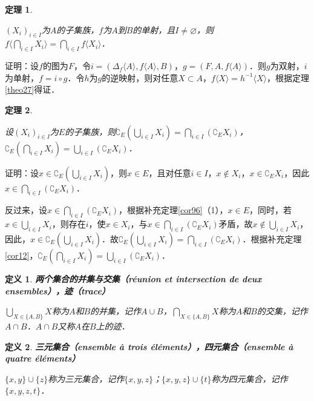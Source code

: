 \documentclass[12pt, a4paper, oneside]{book}
\newtheorem{theo}{定理}
\newtheorem{de}{定义}
\begin{document}
			\begin{theo}\label{theo28}
				\hfill\par
				$(X_i)_{i\in I}$为$A$的子集族，$f$为$A$到$B$的单射，且$I\neq \varnothing$，则$f\langle\bigcap\limits_{i\in I}X_i\rangle=\bigcap\limits_{i\in I}f\langle X_i\rangle$．
			\end{theo}
			证明：设$f$的图为$F$，令$i=(\Delta_f\langle A \rangle , f\langle A \rangle , B)$，$g=(F, A, f\langle A \rangle )$．则$g$为双射，$i$为单射，$f=i\circ g$．令$h$为$g$的逆映射，则对任意$X\subset A$，$f\langle X \rangle =h^{-1}\langle X \rangle $，根据定理\ref{theo27}得证．

			\begin{theo}\label{theo29}
				\hfill\par
				设$(X_i)_{i\in I}$为$E$的子集族，则$\complement_E(\bigcup\limits_{i\in I}X_i)= \bigcap\limits_{i\in I}(\complement_EX_i)$，$\complement_E(\bigcap\limits_{i\in I}X_i)=\bigcup\limits_{i\in I}(\complement_EX_i)$．
			\end{theo}
			证明：设$x\in \complement_E(\bigcup\limits_{i\in I}X_i)$，则$x\in E$，且对任意$i\in I$，$x\notin X_i$，$x\in \complement_EX_i$，因此$x\in \bigcap\limits_{i\in I}(\complement_EX_i)$．
			\par
			反过来，设$x\in \bigcap\limits_{i\in I}(\complement_EX_i)$，根据补充定理\ref{cor96}（1），$x\in E$，同时，若$x\in \bigcup\limits_{i\in I}X_i$，则存在$i$，使$x\in X_i$，与$x\in \bigcap\limits_{i\in I}(\complement_EX_i)$矛盾，故$x\notin \bigcup\limits_{i\in I}X_i$，因此，$x\in \complement_E(\bigcup\limits_{i\in I}X_i)$．故$\complement_E(\bigcup\limits_{i\in I}X_i)= \bigcap\limits_{i\in I}(\complement_EX_i)$．根据补充定理\ref{cor12}，$\complement_E(\bigcap\limits_{i\in I}X_i)= \bigcup\limits_{i\in I}(\complement_EX_i)$．

			\begin{de}
				\textbf{两个集合的并集与交集（réunion et intersection de deux ensembles），迹（trace）}
				\par
				$\bigcup\limits_{X\in \{A, B\}}X$称为$A$和$B$的并集，记作$A\cup B$，$\bigcap\limits_{X\in \{A, B\}}X$称为$A$和$B$的交集，记作$A\cap B$．$A\cap B$又称$A$在$B$上的迹．
			\end{de}
			
			\begin{de}
				\textbf{三元集合（ensemble à trois éléments），四元集合（ensemble à quatre éléments）}
				\par
				$\{x, y\}\cup\{z\}$称为三元集合，记作$\{x, y, z\}$；$\{x, y, z\}\cup\{t\}$称为四元集合，记作$\{x, y, z, t\}$．
			\end{de}
			
\end{document}
